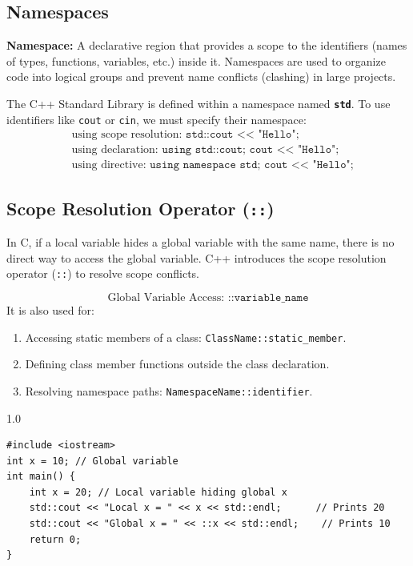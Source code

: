 \documentclass[12pt,a4paper]{article}
\begin{document}
\subsection{Namespaces}
\begin{tcolorbox}[defbox]
\textbf{Namespace:} A declarative region that provides a scope to the identifiers (names of types, functions, variables, etc.) inside it. Namespaces are used to organize code into logical groups and prevent name conflicts (clashing) in large projects.
\end{tcolorbox}
The C++ Standard Library is defined within a namespace named \textbf{\texttt{std}}. To use identifiers like \texttt{cout} or \texttt{cin}, we must specify their namespace:
\begin{align}
  &\text{using scope resolution: } \texttt{std::cout << "Hello";}\\
  &\text{using declaration: } \texttt{using std::cout; cout << "Hello";}\\
  &\text{using directive: } \texttt{using namespace std; cout << "Hello";}
\end{align}

\subsection{Scope Resolution Operator (\texttt{::})}
In C, if a local variable hides a global variable with the same name, there is no direct way to access the global variable. C++ introduces the scope resolution operator (\texttt{::}) to resolve scope conflicts.
\begin{tcolorbox}[formulabox, title={\textbf{Scope Resolution Syntax}}]
\begin{equation}
  \text{Global Variable Access: } \texttt{::variable\_name}
\end{equation}
It is also used for:
\begin{enumerate}[label=\alph*., leftmargin=1.5em, itemsep=1pt]
  \item Accessing static members of a class: \texttt{ClassName::static\_member}.
  \item Defining class member functions outside the class declaration.
  \item Resolving namespace paths: \texttt{NamespaceName::identifier}.
\end{enumerate}
\end{tcolorbox}

\begin{tcolorbox}[examplebox, title={Code Example: Global variable access via Scope Resolution}]
\begin{spacing}{1.0}
\begin{verbatim}
#include <iostream>
int x = 10; // Global variable
int main() {
    int x = 20; // Local variable hiding global x
    std::cout << "Local x = " << x << std::endl;      // Prints 20
    std::cout << "Global x = " << ::x << std::endl;    // Prints 10
    return 0;
}
\end{verbatim}
\end{spacing}
\end{tcolorbox}
\end{document}
